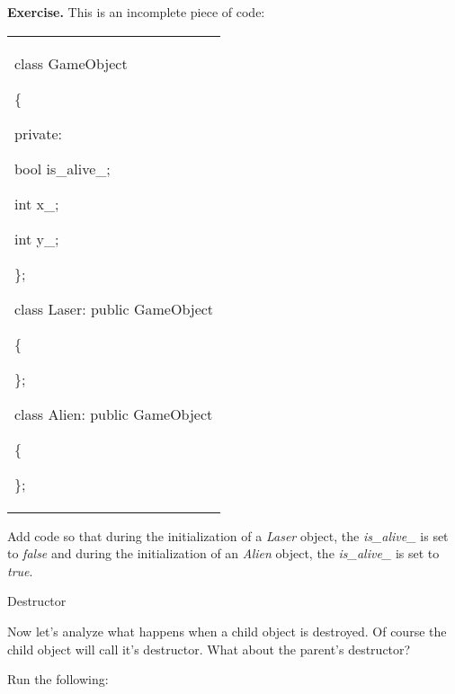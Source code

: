 \documentclass[
]{article}
\begin{document}
\textbf{Exercise.} This is an incomplete piece of code:

\begin{longtable}[]{@{}
  >{\raggedright\arraybackslash}p{}@{}}
\toprule\noalign{}
 \\
\midrule\noalign{}
\endhead
\bottomrule\noalign{}
\endlastfoot
class GameObject

\{

private:

bool is\_alive\_;

int x\_;

int y\_;

\};

class Laser: public GameObject

\{

\};

class Alien: public GameObject

\{

\}; \\
\end{longtable}

Add code so that during the initialization of a \emph{Laser} object, the
\emph{is\_alive\_} is set to \emph{false} and during the initialization
of an \emph{Alien} object, the \emph{is\_alive\_} is set to \emph{true}.

Destructor

Now let's analyze what happens when a child object is destroyed. Of
course the child object will call it's destructor. What about the
parent's destructor?

Run the following:
\end{document}

